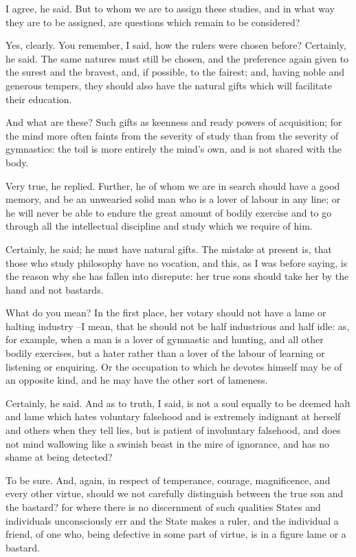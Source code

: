 I agree, he said.
But to whom we are to assign these studies, and in what way they are to be assigned, are questions which remain to be considered?

Yes, clearly.
You remember, I said, how the rulers were chosen before?
Certainly, he said.
The same natures must still be chosen, and the preference again given to the surest and the bravest, and, if possible, to the fairest; and, having noble and generous tempers, they should also have the natural gifts which will facilitate their education.

And what are these?
Such gifts as keenness and ready powers of acquisition; for the mind more often faints from the severity of study than from the severity of gymnastics: the toil is more entirely the mind's own, and is not shared with the body.

Very true, he replied.
Further, he of whom we are in search should have a good memory, and be an unwearied solid man who is a lover of labour in any line; or he will never be able to endure the great amount of bodily exercise and to go through all the intellectual discipline and study which we require of him.

Certainly, he said; he must have natural gifts.
The mistake at present is, that those who study philosophy have no vocation, and this, as I was before saying, is the reason why she has fallen into disrepute: her true sons should take her by the hand and not bastards.

What do you mean?
In the first place, her votary should not have a lame or halting industry --I mean, that he should not be half industrious and half idle: as, for example, when a man is a lover of gymnastic and hunting, and all other bodily exercises, but a hater rather than a lover of the labour of learning or listening or enquiring. Or the occupation to which he devotes himself may be of an opposite kind, and he may have the other sort of lameness.

Certainly, he said.
And as to truth, I said, is not a soul equally to be deemed halt and lame which hates voluntary falsehood and is extremely indignant at herself and others when they tell lies, but is patient of involuntary falsehood, and does not mind wallowing like a swinish beast in the mire of ignorance, and has no shame at being detected?

To be sure.
And, again, in respect of temperance, courage, magnificence, and every other virtue, should we not carefully distinguish between the true son and the bastard? for where there is no discernment of such qualities States and individuals unconsciously err and the State makes a ruler, and the individual a friend, of one who, being defective in some part of virtue, is in a figure lame or a bastard.

